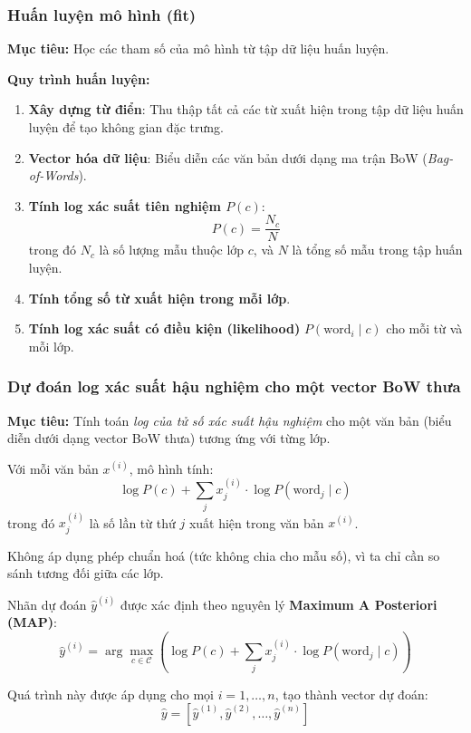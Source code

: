 {\subsubsection{Huấn luyện mô hình (fit)}

\textbf{Mục tiêu:} Học các tham số của mô hình từ tập dữ liệu huấn luyện.

\textbf{Quy trình huấn luyện:}
\begin{enumerate}
    \item \textbf{Xây dựng từ điển}: Thu thập tất cả các từ xuất hiện trong tập dữ liệu huấn luyện để tạo không gian đặc trưng.
    \item \textbf{Vector hóa dữ liệu}: Biểu diễn các văn bản dưới dạng ma trận BoW (\textit{Bag-of-Words}).
    \item \textbf{Tính log xác suất tiên nghiệm $P(c)$}:
    \[
    P(c) = \frac{N_c}{N}
    \]
    trong đó $N_c$ là số lượng mẫu thuộc lớp $c$, và $N$ là tổng số mẫu trong tập huấn luyện.
    \item \textbf{Tính tổng số từ xuất hiện trong mỗi lớp}.
    \item \textbf{Tính log xác suất có điều kiện (likelihood)} $P(\text{word}_i \mid c)$ cho mỗi từ và mỗi lớp.
\end{enumerate}

\subsubsection{Dự đoán log xác suất hậu nghiệm cho một vector BoW thưa}

\textbf{Mục tiêu:} Tính toán \textit{log của tử số xác suất hậu nghiệm} cho một văn bản (biểu diễn dưới dạng vector BoW thưa) tương ứng với từng lớp.

Với mỗi văn bản $x^{(i)}$, mô hình tính:
\[
\log P(c) + \sum_{j} x^{(i)}_j \cdot \log P(\text{word}_j \mid c)
\]
trong đó $x^{(i)}_j$ là số lần từ thứ $j$ xuất hiện trong văn bản $x^{(i)}$.

Không áp dụng phép chuẩn hoá (tức không chia cho mẫu số), vì ta chỉ cần so sánh tương đối giữa các lớp.

Nhãn dự đoán $\hat{y}^{(i)}$ được xác định theo nguyên lý \textbf{Maximum A Posteriori (MAP)}:
\[
\hat{y}^{(i)} = \arg\max_{c \in \mathcal{C}} \left( \log P(c) + \sum_{j} x^{(i)}_j \cdot \log P(\text{word}_j \mid c) \right)
\]

Quá trình này được áp dụng cho mọi $i = 1, \ldots, n$, tạo thành vector dự đoán:
\[
\hat{y} = [\hat{y}^{(1)}, \hat{y}^{(2)}, \ldots, \hat{y}^{(n)}]
\]

}
